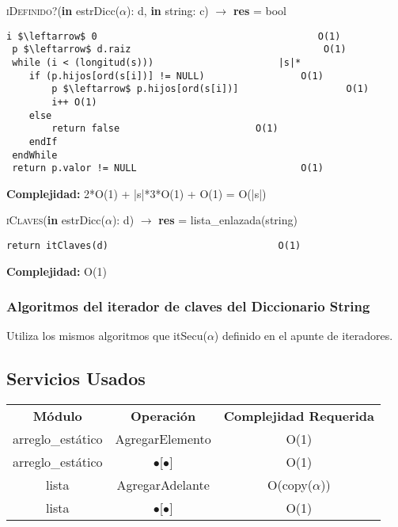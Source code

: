 \textsc{iDefinido?}(\textbf{in} estrDicc($\alpha$): d, \textbf{in} string: c) $\rightarrow$ \textbf{res} = bool
\begin{lstlisting}[mathescape]
 i $\leftarrow$ 0 										O(1)
 p $\leftarrow$ d.raiz 									O(1)
 while (i < (longitud(s))) 						|s|*
 	if (p.hijos[ord(s[i])] != NULL) 				O(1)
		p $\leftarrow$ p.hijos[ord(s[i])] 					O(1)
		i++ O(1)
	else
		return false 						O(1)
	endIf
 endWhile
 return p.valor != NULL 							O(1)
\end{lstlisting}
\textbf{Complejidad:} 2*O(1) + |s|*3*O(1) + O(1) = O(|s|)

\textsc{iClaves}(\textbf{in} estrDicc($\alpha$): d) $\rightarrow$ \textbf{res} = lista\_enlazada(string)
\begin{lstlisting}[mathescape]
return itClaves(d)								O(1)
\end{lstlisting}
\textbf{Complejidad:} O(1)

\subsubsection{Algoritmos del iterador de claves del Diccionario String}

Utiliza los mismos algoritmos que itSecu($\alpha$) definido en el apunte de iteradores.


\subsection{Servicios Usados}
\begin{center}
\begin{tabular*}{2.75\textwidth}{c |c | c }
\textbf{M\'odulo} & \textbf{Operaci\'on} & \textbf{Complejidad Requerida}\\
arreglo\_est\'atico & AgregarElemento & O(1)\\
arreglo\_est\'atico & $\bullet$[$\bullet$] & O(1)\\
lista & AgregarAdelante & O(copy($\alpha$))\\
lista & $\bullet$[$\bullet$] & O(1)\\
\end{tabular*}
\end{center}

